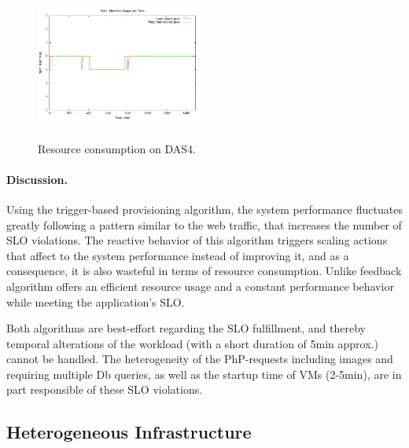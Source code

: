 \begin{figure}
\begin{center}
\includegraphics[width=0.49\textwidth, height=5cm]{./images/homogeneous/numMachinesComp}
\end{center}
\caption{Resource consumption on DAS4.}
\label{resComDas4}
\end{figure}

\paragraph{Discussion.}

Using the trigger-based provisioning algorithm, the system performance fluctuates greatly following a pattern similar to the web traffic, that increases the number of SLO violations. The reactive behavior of this algorithm triggers scaling actions that affect to the system performance instead of improving it, and as a consequence, it is also wasteful in terms of resource consumption. Unlike feedback algorithm offers an efficient resource usage and a constant performance behavior while meeting the application's SLO. 


Both algorithms are best-effort regarding the SLO fulfillment, and thereby temporal alterations of the workload (with a short duration of 5min approx.) cannot be handled. The heterogeneity of the PhP-requests including images and requiring multiple Db queries, as well as the startup time of VMs (2-5min), are in part responsible of these SLO violations. 




\subsection*{Heterogeneous Infrastructure}

